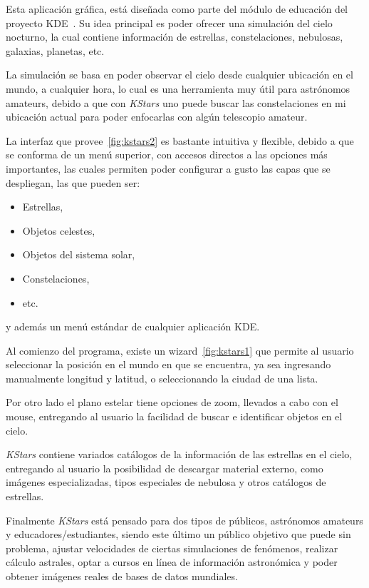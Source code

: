 Esta aplicación gráfica, está diseñada como parte del módulo
de educación del proyecto KDE~\cite{kde}.
Su idea principal es poder ofrecer una simulación
del cielo nocturno, la cual contiene información
de estrellas, constelaciones, nebulosas, galaxias, planetas, etc.

La simulación se basa en poder observar el cielo desde cualquier
ubicación en el mundo, a cualquier hora, lo cual es una herramienta
muy útil para astrónomos amateurs, debido a que con \emph{KStars}
uno puede buscar las constelaciones en mi ubicación actual
para poder enfocarlas con algún telescopio amateur.

La interfaz que provee~\ref{fig:kstars2} es bastante intuitiva y flexible,
debido a que se conforma de un menú superior, con accesos directos 
a las opciones más importantes, las cuales permiten poder configurar
a gusto las capas que se despliegan, las que pueden ser:

\begin{itemize}
    \item Estrellas,
    \item Objetos celestes,
    \item Objetos del sistema solar,
    \item Constelaciones,
    \item etc.
\end{itemize}

y además un menú estándar de cualquier aplicación KDE.

Al comienzo del programa, existe un wizard~\ref{fig:kstars1} que permite al usuario
seleccionar la posición en el mundo en que se encuentra,
ya sea ingresando manualmente longitud y latitud, o seleccionando
la ciudad de una lista.

Por otro lado el plano estelar tiene opciones de zoom, llevados a cabo
con el mouse, entregando al usuario la facilidad de buscar e identificar objetos
en el cielo.

\emph{KStars} contiene variados catálogos de la información
de las estrellas en el cielo, entregando al usuario la posibilidad
de descargar material externo, como imágenes especializadas,
tipos especiales de nebulosa y otros catálogos de estrellas.

Finalmente \emph{KStars} está pensado para dos tipos de públicos,
astrónomos amateurs y educadores/estudiantes, siendo este último
un público objetivo que puede sin problema, ajustar velocidades
de ciertas simulaciones de fenómenos, realizar cálculo astrales,
optar a cursos en línea de información astronómica y poder
obtener imágenes reales de bases de datos mundiales.

